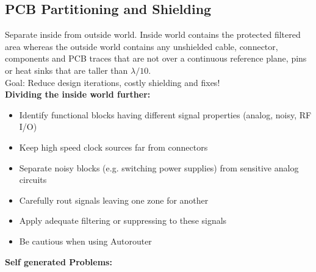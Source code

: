 	\subsection{PCB Partitioning and Shielding}
	Separate inside from outside world. Inside world contains the protected filtered area whereas the outside world contains any unshielded cable, connector, components and PCB traces that are not over a continuous reference plane, pins or heat sinks that are taller than $\lambda/10$.\\
	Goal: Reduce design iterations, costly shielding and fixes! \\
	\textbf{Dividing the inside world further: }
	\begin{itemize}
		\item Identify functional blocks having different signal properties (analog, noisy, RF I/O)
		\item Keep high speed clock sources far from connectors
		\item Separate noisy blocks (e.g. switching power supplies) from sensitive analog circuits
		\item Carefully rout signals leaving one zone for another 
		\item Apply adequate filtering or suppressing to these signals
		\item Be cautious when using Autorouter
	\end{itemize}
	\textbf{Self generated Problems:}
